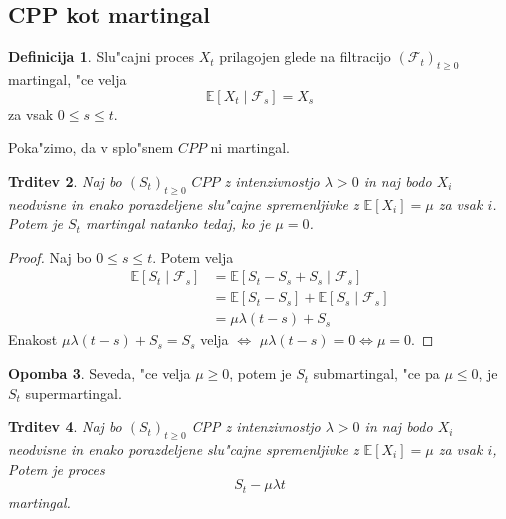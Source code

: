 \documentclass[12pt, a4paper, reqno]{amsart}
\theoremstyle{definition} %
\newtheorem{definicija}{Definicija}[section]
\newtheorem{opomba}[definicija]{Opomba}
\theoremstyle{plain} %
\newtheorem{trditev}[definicija]{Trditev}
\newcommand{\E}{\mathbb{E}}
\newcommand{\F}{\mathcal{F}}
\newcommand{\1}{\mathds{1}}
\begin{document}
    \subsection{CPP kot martingal}

        \begin{definicija}
            Slu"cajni proces $X_t$ prilagojen glede na filtracijo $(\F_t)_{t\geq0}$
            martingal, "ce velja 
            $$
                \E\left[X_t\mid\F_s\right] = X_s
            $$
            za vsak $0\leq s \leq t$.
            \label{def:martingal}
        \end{definicija}

        Poka"zimo, da v splo"snem $CPP$ ni martingal.

        \begin{trditev}
            Naj bo $(S_t)_{t\geq0}$ $CPP$ z intenzivnostjo $\lambda>0$ in naj bodo $X_i$ neodvisne
            in enako porazdeljene slu"cajne spremenljivke z $\E\left[X_i\right] = \mu$ za vsak $i$.
            Potem je $S_t$ martingal natanko tedaj, ko je $\mu = 0$.
            \label{trd:CPPnimartingal}
        \end{trditev}

        \begin{proof}
            Naj bo $0\leq s\leq t$. Potem velja
            \begin{align*}
                \E\left[S_t\mid\F_s\right] 
                        &= \E\left[S_t - S_s + S_s\mid \F_s\right] \\
                        &= \E\left[S_t - S_s\right] + \E\left[S_s\mid \F_s\right] \\
                        &= \mu\lambda(t-s) + S_s
            \end{align*}
           Enakost $\mu\lambda(t-s) + S_s = S_s$ velja $\iff$ $\mu\lambda(t-s) = 0 \iff \mu = 0$.
        \end{proof}

        \begin{opomba}
            Seveda, "ce velja $\mu \geq 0$, potem je $S_t$ submartingal, "ce pa $\mu \leq 0$, je
            $S_t$ supermartingal.
        \end{opomba}

        \begin{trditev}
            Naj bo $(S_t)_{t\geq0}$ CPP z intenzivnostjo $\lambda > 0$ in naj bodo $X_i$ neodvisne
            in enako porazdeljene slu"cajne spremenljivke z $\E\left[X_i\right] = \mu$ za vsak $i$,
            Potem je proces 
            $$
                S_t - \mu\lambda t
            $$
            martingal.
            \label{trd:CPPpostanemartingal}
        \end{trditev}
\end{document}
